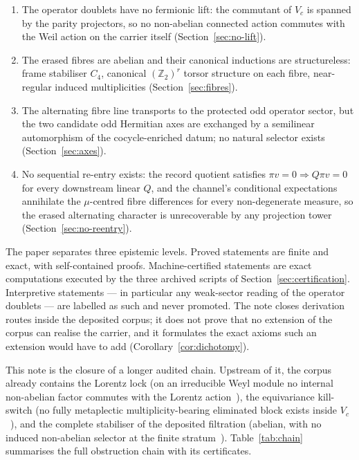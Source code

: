 \documentclass[11pt,a4paper]{article}
\theoremstyle{definition}
\theoremstyle{remark}
\newcommand{\Vc}{V_{c}}
\begin{document}
\begin{enumerate}[label=(\roman*)]
  \item The operator doublets have no fermionic lift: the commutant of $\Vc$ is spanned
  by the parity projectors, so no non-abelian connected action commutes with the Weil
  action on the carrier itself (Section~\ref{sec:no-lift}).
  \item The erased fibres are abelian and their canonical inductions are structureless:
  frame stabiliser $C_4$, canonical $(\mathbb{Z}_2)^r$ torsor structure on each fibre,
  near-regular induced multiplicities (Section~\ref{sec:fibres}).
  \item The alternating fibre line transports to the protected odd operator sector, but
  the two candidate odd Hermitian axes are exchanged by a semilinear automorphism of the
  cocycle-enriched datum; no natural selector exists (Section~\ref{sec:axes}).
  \item No sequential re-entry exists: the record quotient satisfies
  $\pi v=0\Rightarrow Q\pi v=0$ for every downstream linear $Q$, and the channel's
  conditional expectations annihilate the $\mu$-centred fibre differences for every
  non-degenerate measure, so the erased alternating character is unrecoverable by any
  projection tower (Section~\ref{sec:no-reentry}).
\end{enumerate}

The paper separates three epistemic levels.
Proved statements are finite and exact, with self-contained proofs.
Machine-certified statements are exact computations executed by the three archived
scripts of Section~\ref{sec:certification}.
Interpretive statements --- in particular any weak-sector reading of the operator
doublets --- are labelled as such and never promoted.
The note closes derivation routes inside the deposited corpus; it does not prove that no
extension of the corpus can realise the carrier, and it formulates the exact axioms such
an extension would have to add (Corollary~\ref{cor:dichotomy}).

This note is the closure of a longer audited chain.
Upstream of it, the corpus already contains the Lorentz lock (on an irreducible Weyl
module no internal non-abelian factor commutes with the Lorentz
action~\cite{Beau2026q14}), the equivariance kill-switch (no fully metaplectic
multiplicity-bearing eliminated block exists inside $\Vc$~\cite{Korinman2013}), and the
complete stabiliser of the deposited filtration (abelian, with no induced non-abelian
selector at the finite stratum~\cite{Beau2026a37}).
Table~\ref{tab:chain} summarises the full obstruction chain with its certificates.
\end{document}
